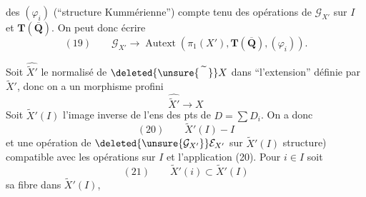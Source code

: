 des $(\varphi_i)$ (``structure Kummérienne'')
compte tenu des opérations  de $\mathcal G_{X'}$
sur $I$ et $\mathbf T(\overline{\mathbf Q})$. On peut donc
écrire
\[
(19)\qquad\mathcal G_{X'}\longrightarrow\operatorname{Autext}(\pi_1(X'),\mathbf T(\overline{\mathbf Q}),(\varphi_i)).
\]

Soit $\widehat{\widetilde X'}$ le normalisé de $\deleted{\unsure{\widetilde{\phantom X}}}X$ dans ``l'extension''
définie par $\widetilde X'$, donc on a un
morphisme profini
\[
\widehat{\widetilde X'}\longrightarrow X
\]
Soit $\widetilde X'(I)$ l'image inverse de l'ens des
pts   de $D=\sum D_i$. On a
donc
\[
(20)\qquad\widetilde X'(I)\mathbin{-}I
\]
et une opération de $\deleted{\unsure{\mathcal G_{X'}}}\mathcal E_{X'}$ sur
$\widetilde X'(I)$  structure)
compatible avec les opérations sur $I$
et l'application (20). Pour $i\in I$ soit
\[
(21)\qquad\widetilde X'(i)\subset\widetilde X'(I)
\]
sa fibre dans $\widetilde X'(I)$,  
